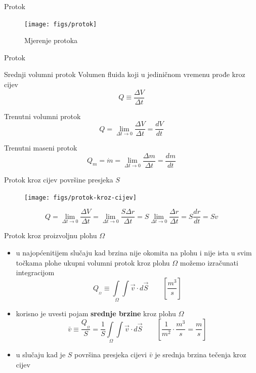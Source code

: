 \documentclass[croatian]{beamer}
\begin{document}
\begin{frame}{Protok}

\begin{figure}
\texttt{[image: figs/protok]}\caption{Mjerenje protoka}
\end{figure}
\end{frame}

\begin{frame}{Protok}

\begin{alertblock}{Srednji volumni protok}
Volumen fluida koji u jediničnom vremenu prođe kroz cijev
\[
Q\equiv\frac{\Delta V}{\Delta t}
\]
\end{alertblock}

\begin{block}{Trenutni volumni protok}
\[
Q=\lim_{\Delta t\rightarrow0}\frac{\Delta V}{\Delta t}=\frac{dV}{dt}
\]
\end{block}

\begin{block}{Trenutni maseni protok}
\[
Q_{m}=\dot{m}=\lim_{\Delta t\rightarrow0}\frac{\Delta m}{\Delta t}=\frac{dm}{dt}
\]
\end{block}
\end{frame}

\begin{frame}{Protok kroz cijev površine presjeka $S$}

\begin{figure}
\texttt{[image: figs/protok-kroz-cijev]}
\end{figure}
\[
Q=\lim_{\Delta t\rightarrow0}\frac{\Delta V}{\Delta t}=\lim_{\Delta t\rightarrow0}\frac{S\Delta r}{\Delta t}=S\lim_{\Delta t\rightarrow0}\frac{\Delta r}{\Delta t}=S\frac{dr}{dt}=Sv
\]
\end{frame}

\begin{frame}{Protok kroz proizvoljnu plohu $\varOmega$}

\begin{itemize}
\item u najopćenitijem slučaju kad brzina nije okomita na plohu i nije ista
u svim točkama plohe ukupni volumni protok kroz plohu $\varOmega$
možemo izračunati integracijom
\[
Q_{_{\varOmega}}\equiv\int\limits _{\;\varOmega}\!\!\!\!\!\int\vec{v}\cdot d\vec{S}\quad\quad[\frac{m^{3}}{s}]
\]
\item korisno je uvesti pojam \textbf{srednje brzine} kroz plohu $\varOmega$
\[
\bar{v}\equiv\frac{Q_{_{\varOmega}}}{S}=\frac{1}{S}\int\limits _{\;\varOmega}\!\!\!\!\!\int\vec{v}\cdot d\vec{S}\quad\quad[\frac{1}{m^{2}}\cdot\frac{m^{3}}{s}=\frac{m}{s}]
\]
\item u slučaju kad je $S$ površina presjeka cijevi $\bar{v}$ je srednja
brzina tečenja kroz cijev
\end{itemize}
\end{frame}
\end{document}
